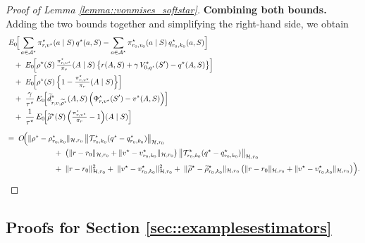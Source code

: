 \documentclass[11pt]{article}
\theoremstyle{plain}
\begin{document}
\begin{proof}[Proof of Lemma \ref{lemma::vonmises_softstar}]
\noindent \textbf{Combining both bounds.}  
Adding the two bounds together and simplifying the right-hand side, we obtain
\begin{align*}
&\;E_0\!\Big[
    \sum_{a \in \mathcal{A}^\star} 
        \pi_{r,v^\star}^\star(a \mid S)\,q^\star(a,S) 
        - 
        \sum_{a \in \mathcal{A}^\star} 
        \pi_{r_0,v_0}^\star(a \mid S)\,q_{r_0,k_0}^\star(a,S)
\Big]
\\
&\quad+\;
E_0\!\Big[
    \rho^\star(S)\,
    \tfrac{\pi_{r,v^\star}^\star}{\pi_r}(A \mid S)\,
    \bigl\{ r(A,S)+\gamma\,V_{0,q^\star}^\star(S')-q^\star(A,S)\bigr\}
\Big]
\\
&\quad+\;
E_0\!\Big[
    \rho^\star(S)\,
    \Bigl\{1-\tfrac{\pi_{r,v^\star}^\star}{\pi_r}(A \mid S)\Bigr\}
\Big]
\\
&\quad+\;
\frac{\gamma}{\tau^\star}\,
E_0\!\Big[
       \widetilde{d}_{r,v,\widetilde{\rho}^\star}^\star(A,S)\,
       \Bigl(\Phi_{r,v^\star}^\star(S') - v^\star(A,S)\Bigr)
\Big]
\\
&\quad+\;
\frac{1}{\tau^\star}\,
E_0\!\Big[
        \widetilde{\rho}^\star(S)\,
        \Bigl(\tfrac{\pi_{r,v^\star}^\star}{\pi_r}-1\Bigr)(A \mid S)
\Big]
\\[6pt]
&=\;
O\!\Big(
     \|\rho^\star - \rho_{r_0,k_0}^\star\|_{\mathcal{H},r_0}\,
     \bigl\|\mathcal{T}_{r_0,k_0}^\star(q^\star - q_{r_0,k_0}^\star)\bigr\|_{\mathcal{H},r_0}
\\
&\hspace{2.2cm}
     +\;
     \bigl(\|r-r_0\|_{\mathcal{H},r_0} + \|v^\star - v_{r_0,k_0}^\star\|_{\mathcal{H},r_0}\bigr)\,
     \bigl\|\mathcal{T}_{r_0,k_0}^\star(q^\star - q_{r_0,k_0}^\star)\bigr\|_{\mathcal{H},r_0}
\\
&\hspace{2.2cm}
     +\;
     \|r-r_0\|_{\mathcal{H},r_0}^{2}
     +\;
     \|v^\star - v_{r_0,k_0}^\star\|_{\mathcal{H},r_0}^{2}
     +\;
     \|\widetilde{\rho}^\star - \widetilde{\rho}_{r_0,k_0}^\star\|_{\mathcal{H},r_0}\,
     \bigl(\|r-r_0\|_{\mathcal{H},r_0}+\|v^\star - v_{r_0,k_0}^\star\|_{\mathcal{H},r_0}\bigr)
\Big).
\end{align*}

\end{proof}



\subsection{Proofs for Section \ref{sec::examplesestimators}}
\end{document}
